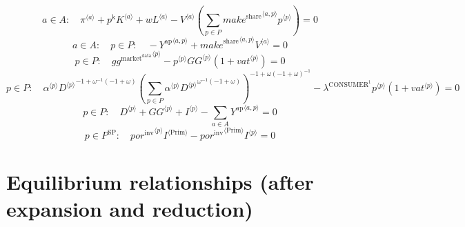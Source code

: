 \begin{equation}
a\in A\colon\quad {\pi}^{\langle a\rangle} + {p^{\mathrm{k}}} {{K}^{\langle a\rangle}} + {w} {{L}^{\langle a\rangle}} - {{V}^{\langle a\rangle}} \left(\sum_{p\in P} {{{m\!a\!k\!e}^{\mathrm{share}}}^{\langle a,p\rangle}} {{p}^{\langle p\rangle}}\right) = 0
\end{equation}
\begin{equation}
a\in A\colon\quad p\in P\colon\quad -{Y^{\mathrm{ap}}}^{\langle a,p\rangle} + {{{m\!a\!k\!e}^{\mathrm{share}}}^{\langle a,p\rangle}} {{V}^{\langle a\rangle}} = 0
\end{equation}
\begin{equation}
p\in P\colon\quad {{g\!g}^{\mathrm{market}^{\mathrm{data}}}}^{\langle p\rangle} - {{p}^{\langle p\rangle}} {{{G\!G}}^{\langle p\rangle}} \left(1 + {{v\!a\!t}}^{\langle p\rangle}\right) = 0
\end{equation}
\begin{equation}
p\in P\colon\quad {{\alpha}^{\langle p\rangle}} {{{D}^{\langle p\rangle}}^{-1 + {\omega}^{-1} \left(-1 + \omega\right)}} {\left(\sum_{p\in P} {{\alpha}^{\langle p\rangle}} {{{D}^{\langle p\rangle}}^{{\omega}^{-1} \left(-1 + \omega\right)}}\right)^{-1 + {\omega} \left(-1 + \omega\right)^{-1}}} - {\lambda^{\mathrm{CONSUMER}^{\mathrm{1}}}} {{p}^{\langle p\rangle}} \left(1 + {{v\!a\!t}}^{\langle p\rangle}\right) = 0
\end{equation}
\begin{equation}
p\in P\colon\quad {D}^{\langle p\rangle} + {{G\!G}}^{\langle p\rangle} + {I}^{\langle p\rangle} - \sum_{a\in A} {Y^{\mathrm{ap}}}^{\langle a,p\rangle} = 0
\end{equation}
\begin{equation}
p\in P^{\mathrm{SP}}\colon\quad {{{p\!o\!r}^{\mathrm{inv}}}^{\langle p\rangle}} {{I}^{\langle \mathrm{Prim}\rangle}} - {{{p\!o\!r}^{\mathrm{inv}}}^{\langle \mathrm{\mathrm{Prim}}\rangle}} {{I}^{\langle p\rangle}} = 0
\end{equation}



\section{Equilibrium relationships (after expansion and reduction)}

